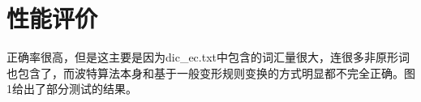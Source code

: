\documentclass[UTF8]{article}
\begin{document}
\section{性能评价}

正确率很高，但是这主要是因为dic\_ec.txt中包含的词汇量很大，连很多非原形词也包含了，而波特算法本身和基于一般变形规则变换的方式明显都不完全正确。图1给出了部分测试的结果。
\begin{center}

\end{center}
\end{document}
